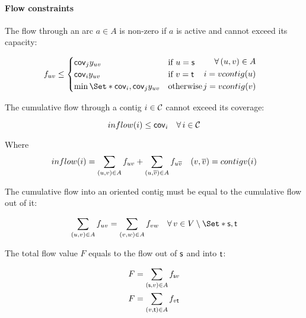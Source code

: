 \paragraph{Flow constraints}

The flow through an arc \(a \in A\) is non-zero if \(a\) is active and cannot exceed its capacity:
\begin{Constraint}
  \begin{align}
    f_{uv} \leq
    \begin{cases}
      \cov{j} y_{uv} & \text{if \(u = \source{}\)} \\
      \cov{i} y_{uv} & \text{if \(v = \sink{}\)} \\
      \min\Set*{\cov{i}, \cov{j}} y_{uv} & \text{otherwise}
    \end{cases} &
    \begin{split}
      \forall (u, v) \in A \\
      i = vcontig(u) \\
      j = vcontig(v)
    \end{split} \label{pbf_iterbin:milp:cst:flow:arc_flow_at_most_coverage} %
  \end{align}
\end{Constraint}

The cumulative flow through a contig \(i \in \mathcal{C}{}\) cannot exceed its coverage:
\begin{Constraint}
  \begin{equation}
    inflow(i) \leq \cov{i} \quad \forall i \in \Contigs{} \label{pbf_iterbin:milp:cst:flow:inflow_at_most_coverage} %
  \end{equation}
\end{Constraint}
Where \[
  inflow(i) = \sum_{(u, v) \in A} f_{uv} + \sum_{(u, \overline{v}) \in A} f_{u\overline{v}} \quad (v, \overline{v}) = contigv(i)
\]

The cumulative flow into an oriented contig must be equal to the cumulative flow out of it:
\begin{Constraint}
  \begin{equation}
    \sum_{(u, v) \in A} f_{u v} = \sum_{(v, w) \in A} f_{v w} \quad \forall v \in V \setminus \Set*{\source{}, \sink{}} \label{pbf_iterbin:milp:cst:flow:flow_conservation} %
  \end{equation}
\end{Constraint}

The total flow value \(F\) equals to the flow out of \(\mathsf{s}{}\) and into \(\mathsf{t}{}\):
\begin{Constraint}
  \begin{align}
    F & = \sum_{(\source{}, v) \in A} f_{\source{} v} \label{pbf_iterbin:milp:cst:flow:total_flow_source} \\ %
    F & = \sum_{(v, \sink{}) \in A} f_{v \sink{}} \label{pbf_iterbin:milp:cst:flow:total_flow_sink} %
  \end{align}
\end{Constraint}

